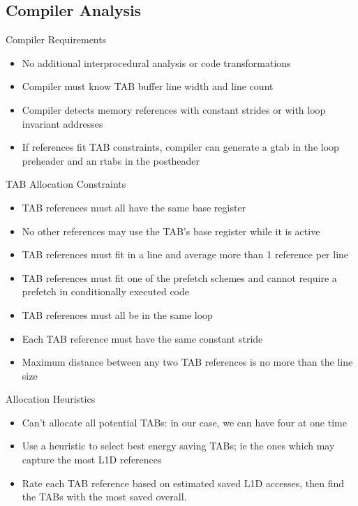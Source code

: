 \documentclass{beamer}
\begin{document}
\subsection{Compiler Analysis}
\begin{frame}{Compiler Requirements}
   \begin{itemize}
      \item No additional interprocedural analysis or code transformations
      \item Compiler must know TAB buffer line width and line count
      \item Compiler detects memory references with constant strides or with
         loop invariant addresses
      \item If references fit TAB constraints, compiler can generate a gtab in
         the loop preheader and an rtabs in the postheader
   \end{itemize}
\end{frame}
\begin{frame}{TAB Allocation Constraints}
   \begin{itemize}
      \item TAB references must all have the same base register
      \item No other references may use the TAB's base register
         while it is active
      \item TAB references must fit in a line and average more than 1 
         reference per line
      \item TAB references must fit one of the prefetch schemes and cannot require
         a prefetch in conditionally executed code
      \item TAB references must all be in the same loop
      \item Each TAB reference must have the same constant stride
      \item Maximum distance between any two TAB references is no more 
         than the line size
   \end{itemize}
\end{frame}
\begin{frame}{Allocation Heuristics}
   \begin{itemize}
      \item Can't allocate all potential TABs: in our case, we can have 
         four at one time
      \item Use a heuristic to select best energy saving TABs; ie the ones which
         may capture the most L1D references
      \item Rate each TAB reference based on estimated saved L1D accesses,
         then find the TABs with the most saved overall.
   \end{itemize}
\end{frame}
\end{document}

